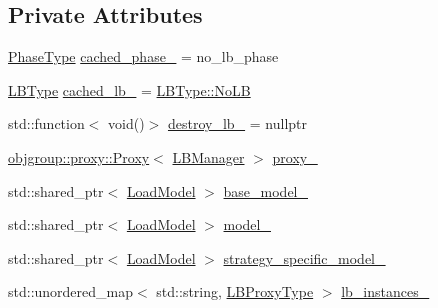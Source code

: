 \subsection*{Private Attributes}
\begin{DoxyCompactItemize}
\item 
\hyperlink{namespacevt_a46ce6733d5cdbd735d561b7b4029f6d7}{Phase\+Type} \hyperlink{structvt_1_1vrt_1_1collection_1_1balance_1_1_l_b_manager_aa15bf182a0d70f1fc756ac8893422777}{cached\+\_\+phase\+\_\+} = no\+\_\+lb\+\_\+phase
\item 
\hyperlink{namespacevt_1_1vrt_1_1collection_1_1balance_ac4f99693509affcc67db182d4aad9b5c}{L\+B\+Type} \hyperlink{structvt_1_1vrt_1_1collection_1_1balance_1_1_l_b_manager_aa21ee592ddcc09c269e546c0ebf47fd3}{cached\+\_\+lb\+\_\+} = \hyperlink{namespacevt_1_1vrt_1_1collection_1_1balance_ac4f99693509affcc67db182d4aad9b5cad12268b59a4f1098aee001f9a1750020}{L\+B\+Type\+::\+No\+LB}
\item 
std\+::function$<$ void()$>$ \hyperlink{structvt_1_1vrt_1_1collection_1_1balance_1_1_l_b_manager_a31af388e759240311470c17ec569155c}{destroy\+\_\+lb\+\_\+} = nullptr
\item 
\hyperlink{structvt_1_1objgroup_1_1proxy_1_1_proxy}{objgroup\+::proxy\+::\+Proxy}$<$ \hyperlink{structvt_1_1vrt_1_1collection_1_1balance_1_1_l_b_manager}{L\+B\+Manager} $>$ \hyperlink{structvt_1_1vrt_1_1collection_1_1balance_1_1_l_b_manager_a4fef6bf68a7aee9980270ceeb5df0c2b}{proxy\+\_\+}
\item 
std\+::shared\+\_\+ptr$<$ \hyperlink{structvt_1_1vrt_1_1collection_1_1balance_1_1_load_model}{Load\+Model} $>$ \hyperlink{structvt_1_1vrt_1_1collection_1_1balance_1_1_l_b_manager_ace781095ef59c156a0b23dea6dea70db}{base\+\_\+model\+\_\+}
\item 
std\+::shared\+\_\+ptr$<$ \hyperlink{structvt_1_1vrt_1_1collection_1_1balance_1_1_load_model}{Load\+Model} $>$ \hyperlink{structvt_1_1vrt_1_1collection_1_1balance_1_1_l_b_manager_a4298255e00b2012d3417a63130dc91c3}{model\+\_\+}
\item 
std\+::shared\+\_\+ptr$<$ \hyperlink{structvt_1_1vrt_1_1collection_1_1balance_1_1_load_model}{Load\+Model} $>$ \hyperlink{structvt_1_1vrt_1_1collection_1_1balance_1_1_l_b_manager_ad9c5ed71d25d99877726394fe7f8f704}{strategy\+\_\+specific\+\_\+model\+\_\+}
\item 
std\+::unordered\+\_\+map$<$ std\+::string, \hyperlink{structvt_1_1vrt_1_1collection_1_1balance_1_1_l_b_manager_a8b1a7735366beb85c2c2ccc3912cdd80}{L\+B\+Proxy\+Type} $>$ \hyperlink{structvt_1_1vrt_1_1collection_1_1balance_1_1_l_b_manager_aa25f8223d51a33ca1c583b56fd2a98c2}{lb\+\_\+instances\+\_\+}

\end{DoxyCompactItemize}
